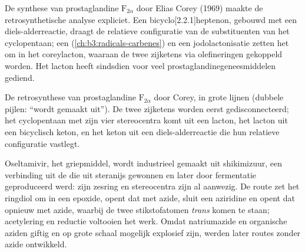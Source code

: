 De synthese van prostaglandine $\mathrm F_{2\alpha}$ door Elias Corey (1969) maakte de
retrosynthetische analyse expliciet. Een bicyclo[2.2.1]heptenon,
gebouwd met een diels-alderreactie, draagt de relatieve configuratie van
de substituenten van het cyclopentaan; een
 (\cref{ch:b3:radicals-carbenes}) en een
jodolactonisatie zetten het om in het coreylacton, waaraan de twee
zijketens via olefineringen gekoppeld worden. Het lacton heeft sindsdien
voor veel prostaglandinegeneesmiddelen gediend.

\begin{omfigure}

{\small De retrosynthese van prostaglandine $\mathrm F_{2\alpha}$ door Corey, in grote lijnen (dubbele pijlen: ``wordt
gemaakt uit''). De twee zijketens worden eerst gedisconnecteerd; het
cyclopentaan met zijn vier stereocentra komt uit een lacton, het lacton
uit een bicyclisch keton, en het keton uit een diels-alderreactie die hun
relatieve configuratie vastlegt.}
\end{omfigure}

Oseltamivir, het griepmiddel, wordt industrieel gemaakt uit shikimizuur,
een verbinding uit de  die uit steranijs gewonnen en later
door fermentatie geproduceerd werd: zijn zesring en stereocentra zijn al
aanwezig. De route zet het ringdiol om in een epoxide, opent dat met
azide, sluit een aziridine en opent dat opnieuw met azide, waarbij de
twee stikstofatomen \textit{trans} komen te staan; acetylering en reductie
voltooien het werk. Omdat natriumazide en organische aziden giftig en op
grote schaal mogelijk explosief zijn, werden later routes zonder azide
ontwikkeld.

